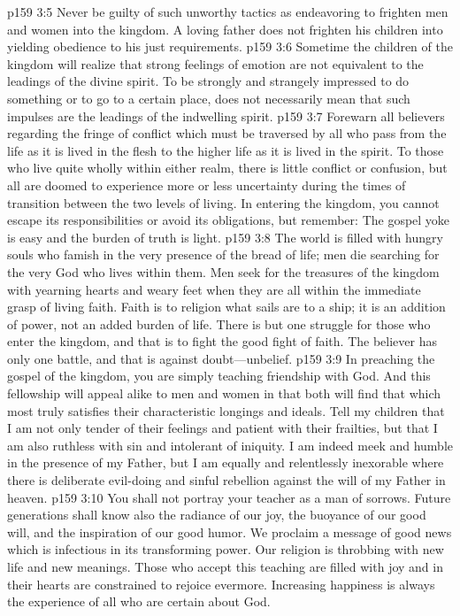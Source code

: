 \vs p159 3:5 Never be guilty of such unworthy tactics as endeavoring to frighten men and women into the kingdom. A loving father does not frighten his children into yielding obedience to his just requirements.
\vs p159 3:6 Sometime the children of the kingdom will realize that strong feelings of emotion are not equivalent to the leadings of the divine spirit. To be strongly and strangely impressed to do something or to go to a certain place, does not necessarily mean that such impulses are the leadings of the indwelling spirit.
\vs p159 3:7 Forewarn all believers regarding the fringe of conflict which must be traversed by all who pass from the life as it is lived in the flesh to the higher life as it is lived in the spirit. To those who live quite wholly within either realm, there is little conflict or confusion, but all are doomed to experience more or less uncertainty during the times of transition between the two levels of living. In entering the kingdom, you cannot escape its responsibilities or avoid its obligations, but remember: The gospel yoke is easy and the burden of truth is light.
\vs p159 3:8 The world is filled with hungry souls who famish in the very presence of the bread of life; men die searching for the very God who lives within them. Men seek for the treasures of the kingdom with yearning hearts and weary feet when they are all within the immediate grasp of living faith. Faith is to religion what sails are to a ship; it is an addition of power, not an added burden of life. There is but one struggle for those who enter the kingdom, and that is to fight the good fight of faith. The believer has only one battle, and that is against doubt---unbelief.
\vs p159 3:9 In preaching the gospel of the kingdom, you are simply teaching friendship with God. And this fellowship will appeal alike to men and women in that both will find that which most truly satisfies their characteristic longings and ideals. Tell my children that I am not only tender of their feelings and patient with their frailties, but that I am also ruthless with sin and intolerant of iniquity. I am indeed meek and humble in the presence of my Father, but I am equally and relentlessly inexorable where there is deliberate evil\hyp{}doing and sinful rebellion against the will of my Father in heaven.
\vs p159 3:10 You shall not portray your teacher as a man of sorrows. Future generations shall know also the radiance of our joy, the buoyance of our good will, and the inspiration of our good humor. We proclaim a message of good news which is infectious in its transforming power. Our religion is throbbing with new life and new meanings. Those who accept this teaching are filled with joy and in their hearts are constrained to rejoice evermore. Increasing happiness is always the experience of all who are certain about God.
